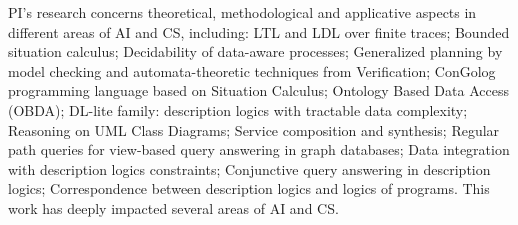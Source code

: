 





PI's research concerns theoretical, methodological and applicative aspects in different areas of AI and CS, including:
LTL and LDL over finite traces;
Bounded situation calculus;
Decidability of data-aware processes;
Generalized planning by model checking and automata-theoretic
techniques from Verification;
ConGolog programming language based on Situation Calculus;
Ontology Based Data Access (OBDA);
DL-lite family: description logics with tractable data complexity;
Reasoning on UML Class Diagrams;
Service composition and synthesis;
Regular path queries for view-based query answering in graph databases;
Data integration with description logics constraints;
Conjunctive query answering in description logics;
Correspondence between description logics and logics of programs.
This work has deeply impacted several areas of AI and CS.

